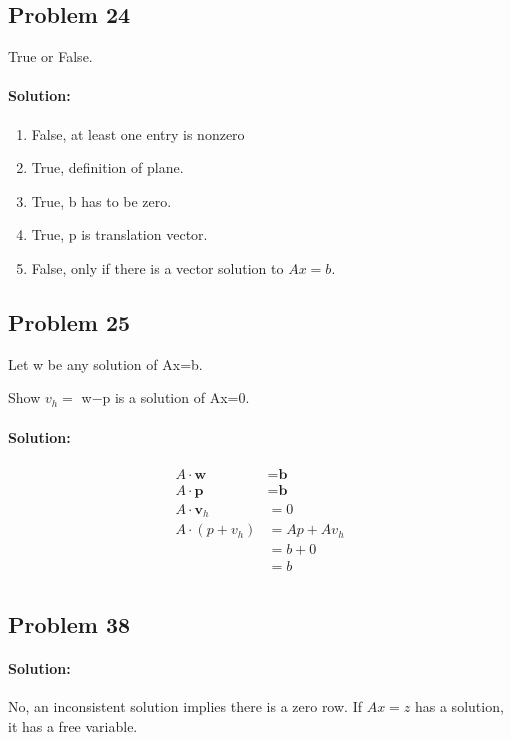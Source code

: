 \documentclass[11pt, notitlepage]{report}
\newenvironment{solution}{\paragraph{\small Solution:}}{\hfill}
\begin{document}
\subsection{Problem 24}

True or False.

\begin{solution}

\begin{enumerate}[label=\alph*.)]
	\item False, at least one entry is nonzero
	\item True, definition of plane.
	\item True, b has to be zero.
	\item True, p is translation vector. 
	\item False, only if there is a vector solution to $Ax=b$.
\end{enumerate}

\end{solution}

\subsection{Problem 25}

Let w be any solution of Ax=b.

Show $v_h=$ w$-$p is a solution of Ax=0.

\begin{solution}

\begin{align*}
A\cdot \textbf{w} 	&= \textbf{b} 	\\
A\cdot \textbf{p} 	&= \textbf{b} 	\\
A\cdot \textbf{v}_h &= 0	    			\\
A\cdot (p+v_h) 		&= Ap + Av_h 	\\
					&= b + 0 		\\
					&= b		 		\\
\end{align*}

\end{solution}

\subsection{Problem 38}
\begin{solution}

No, an inconsistent solution implies there is a zero row. If $Ax=z$ has a solution, it has a free variable.

\end{solution}
\end{document}
